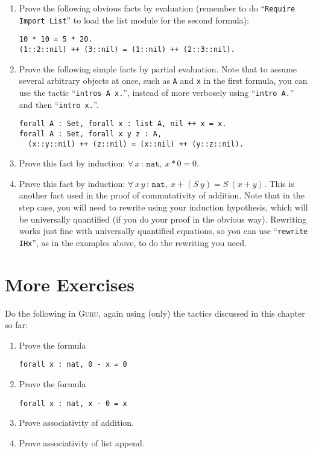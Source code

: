 \documentclass{book}[12pt]
\newcommand{\guru}[0]{\textsc{Guru}}
\begin{document}
\begin{enumerate}
\item Prove the following obvious facts by evaluation (remember to do
``\texttt{Require Import List}'' to load the list module for the second
formula):
\begin{verbatim}
10 * 10 = 5 * 20.
(1::2::nil) ++ (3::nil) = (1::nil) ++ (2::3::nil).
\end{verbatim}

\item Prove the following simple facts by partial evaluation.  Note
that to assume several arbitrary objects at once, such as \texttt{A}
and \texttt{x} in the first formula, you can use the tactic
``\texttt{intros A x.}'', instead of more verbosely using
``\texttt{intro A.}'' and then ``\texttt{intro x.}''.
\begin{verbatim}
forall A : Set, forall x : list A, nil ++ x = x.
forall A : Set, forall x y z : A, 
  (x::y::nil) ++ (z::nil) = (x::nil) ++ (y::z::nil).
\end{verbatim}

\item Prove this fact by induction: $\forall\, x\, :\, \texttt{nat},\ x * 0 = 0$.

\item Prove this fact by induction: $\forall\, x\, y\, :\,
\texttt{nat},\ x + (S\ y) = S\ (x + y)$.  This is another fact used in
the proof of commutativity of addition.  Note that in the step case,
you will need to rewrite using your induction hypothesis, which will
be universally quantified (if you do your proof in the obvious way).
Rewriting works just fine with universally quantified equations, so
you can use ``\texttt{rewrite IHx}'', as in the examples above, to do
the rewriting you need.

\end{enumerate}

\section{More Exercises}

Do the following in \guru, again using (only) the tactics discussed in
this chapter so far:

\begin{enumerate}
\item Prove the formula
\begin{verbatim}
forall x : nat, 0 - x = 0
\end{verbatim}
\item Prove the formula
\begin{verbatim}
forall x : nat, x - 0 = x
\end{verbatim}
\item Prove associativity of addition.
\item Prove associativity of list append.
\end{enumerate}
\end{document}
